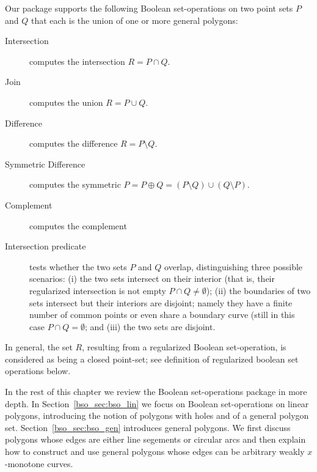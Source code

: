 Our package supports the following Boolean set-operations on two point
sets $P$ and $Q$ that each is the union of one or more general polygons:
\begin{description}
\item[Intersection] computes the intersection $R = P \cap Q$.
\item[Join] computes the union $R = P \cup Q$.
\item [Difference] computes the difference $R = P \setminus Q$.
\item [Symmetric Difference] computes the symmetric
   $P = P \oplus Q = (P \setminus Q) \cup (Q \setminus P)$.
\item[Complement] computes the complement
\item [Intersection predicate] tests whether the two sets $P$ and $Q$
  overlap, distinguishing three possible scenarios: (i) the two sets
  intersect on their interior (that is, their regularized intersection
  is not empty $P \cap Q \neq \emptyset$); (ii) the boundaries of two
  sets intersect but their interiors are disjoint; namely they have a
  finite number of common points or even share a boundary curve (still
  in this case $P \cap Q = \emptyset$; and (iii) the two sets are
  disjoint.
\end{description}
In general, the set $R$, resulting from a regularized Boolean
set-operation, is considered as being a closed point-set; see definition of regularized boolean set operations below.

In the rest of this chapter we review the Boolean set-operations package
in more depth. In Section~\ref{bso_sec:bso_lin} we focus on Boolean 
set-operations on linear polygons, introducing the notion of polygons with 
holes and of a general polygon set. Section~\ref{bso_sec:bso_gen}
introduces general polygons.
We first discuss polygons whose edges are either line segements or circular
arcs and then explain how to construct and use general polygons whose edges
can be arbitrary weakly $x$-monotone curves.
